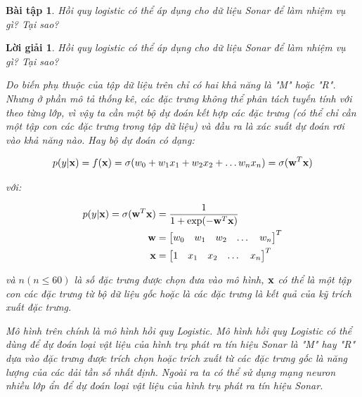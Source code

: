 \documentclass[14pt, a4paper]{article}
\theoremstyle{sltheorem}
\newtheorem{baitap}{Bài tập}
\theoremstyle{soltheorem}
\newtheorem*{loigiai}{Lời giải}
\begin{document}
\begin{baitap}
    Hồi quy logistic có thể áp dụng cho dữ liệu Sonar để làm nhiệm vụ gì? Tại sao?
\end{baitap}

\begin{loigiai}
    Hồi quy logistic có thể áp dụng cho dữ liệu Sonar để làm nhiệm vụ gì? Tại sao?
        
    Do biến phụ thuộc của tập dữ liệu trên chỉ có hai khả năng là "M" hoặc "R".
    Nhưng ở phần mô tả thống kê, các đặc trưng không thể phân tách tuyến tính với theo từng lớp, vì vậy ta cần một bộ dự đoán kết hợp các đặc trưng (có thể chỉ cần một tập con các đặc trưng trong tập dữ liệu) và đầu ra là xác suất dự đoán rơi vào khả năng nào.
    Hay bộ dự đoán có dạng:

    \begin{equation*}
        p(y \vert \bold{x}) = f(\bold{x}) = \sigma(w_0 + w_1 x_1 + w_2 x_2 + \dots w_n x_n) = \sigma(\bold{w}^T \bold{x})
    \end{equation*}

    với:
        
    \begin{equation*}
        \begin{aligned}
            p(y \vert \bold{x}) = \sigma(\bold{w}^T \bold{x}) &= \dfrac{1}{1 + \exp(-\bold{w}^T \bold{x})} \\
            \bold{w} &= \begin{bmatrix}
                w_0 & w_1 & w_2 & \dots & w_n
            \end{bmatrix}^T \\
            \bold{x} &= \begin{bmatrix}
                1 & x_1 & x_2 & \dots & x_n
            \end{bmatrix}^T
        \end{aligned}
    \end{equation*}

    và $n (n \leq 60)$ là số đặc trưng được chọn đưa vào mô hình, $\bold{x}$ có thể là một tập con các đặc trưng từ bộ dữ liệu gốc hoặc là các đặc trưng là kết quả của kỹ trích xuất đặc trưng.

    Mô hình trên chính là mô hình hồi quy Logistic. 
    Mô hình hồi quy Logistic có thể dùng để dự đoán loại vật liệu của hình trụ phát ra tín hiệu Sonar là "M" hay "R" dựa vào đặc trưng được trích chọn hoặc trích xuất từ các đặc trưng gốc là năng lượng của các dải tần số nhất định.
    Ngoài ra ta có thể sử dụng mạng neuron nhiều lớp ẩn để dự đoán loại vật liệu của hình trụ phát ra tín hiệu Sonar.
\end{loigiai}
\end{document}
